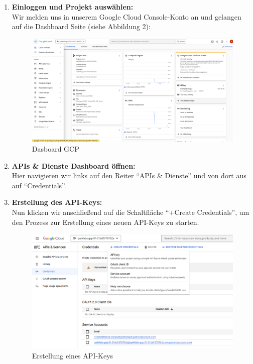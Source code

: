 \documentclass[12pt,a4paper]{article}
\begin{document}
\begin{enumerate}[label=\textbf{\arabic*.}]
	\item \textbf{Einloggen und Projekt auswählen:} \\
	Wir melden uns in unserem Google Cloud Console-Konto an und gelangen auf die Dashboard Seite (siehe Abbildung 2):

	\begin{figure}[h!]
		\centering
		\includegraphics[width=1\linewidth]{../images/Dashboard}
		\caption{Dasboard GCP}
		\label{fig:dashboard}
	\end{figure}
\item \textbf{APIs \& Dienste Dashboard öffnen:} \\
Hier navigieren wir links auf den Reiter \enquote{APIs \& Dienste} und von dort aus auf \enquote{Credentials}. \\
 \item \textbf{Erstellung des API-Keys:} \\ 
 Nun klicken wir anschließend auf die Schaltfläche \enquote{+Create Credentials}, um den Prozess zur Erstellung eines neuen API-Keys zu starten.
\begin{figure}[h!]
	\centering
	\includegraphics[width=0.8\linewidth]{../images/API}
	\caption{Erstellung eines API-Keys}
	\label{fig:api}

\end{figure}
\end{enumerate}
\end{document}
